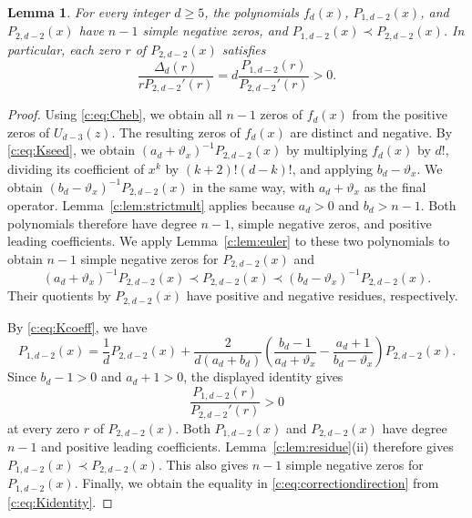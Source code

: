 \documentclass[11pt]{article}
\numberwithin{equation}{section}
\newtheorem{lemma}[theorem]{Lemma}
\theoremstyle{remark}\newtheorem{remark}[theorem]{Remark}
\newcommand{\varthetax}{\vartheta_x}
\begin{document}
\begin{lemma}\label{c:lem:comparisonzeros}
For every integer $d\ge5$, the polynomials $f_d(x)$, $P_{1,d-2}(x)$, and $P_{2,d-2}(x)$
have $n-1$ simple negative zeros, and $P_{1,d-2}(x)\prec P_{2,d-2}(x)$.
In particular, each zero $r$ of $P_{2,d-2}(x)$ satisfies
\begin{equation}\label{c:eq:correctiondirection}
 \frac{\Delta_d(r)}{rP_{2,d-2}'(r)}=d\frac{P_{1,d-2}(r)}{P_{2,d-2}'(r)}>0.
\end{equation}
\end{lemma}
\begin{proof}
Using \eqref{c:eq:Cheb}, we obtain all $n-1$ zeros of $f_d(x)$ from
the positive zeros of $U_{d-3}(z)$. The resulting zeros of $f_d(x)$
are distinct and negative.
By \eqref{c:eq:Kseed}, we obtain
$(a_d+\varthetax)^{-1}P_{2,d-2}(x)$ by multiplying $f_d(x)$ by $d!$,
dividing its coefficient of $x^k$ by $(k+2)!(d-k)!$, and applying
$b_d-\varthetax$. We obtain $(b_d-\varthetax)^{-1}P_{2,d-2}(x)$ in
the same way, with $a_d+\varthetax$ as the final operator.
Lemma~\ref{c:lem:strictmult} applies because $a_d>0$ and $b_d>n-1$.
Both polynomials therefore have degree $n-1$, simple negative zeros,
and positive leading coefficients.
We apply Lemma~\ref{c:lem:euler} to these two polynomials to obtain
$n-1$ simple negative zeros for $P_{2,d-2}(x)$ and
\[
 (a_d+\varthetax)^{-1}P_{2,d-2}(x)\prec P_{2,d-2}(x)
 \prec(b_d-\varthetax)^{-1}P_{2,d-2}(x).
\]
Their quotients by $P_{2,d-2}(x)$ have positive and negative residues,
respectively.

By \eqref{c:eq:Kcoeff}, we have
\[
 P_{1,d-2}(x)=\frac1dP_{2,d-2}(x)+\frac{2}{d(a_d+b_d)}
 \left(\frac{b_d-1}{a_d+\varthetax}
       -\frac{a_d+1}{b_d-\varthetax}\right)P_{2,d-2}(x).
\]
Since $b_d-1>0$ and $a_d+1>0$, the displayed identity gives
\[
 \frac{P_{1,d-2}(r)}{P_{2,d-2}'(r)}>0
\]
at every zero $r$ of $P_{2,d-2}(x)$.
Both $P_{1,d-2}(x)$ and $P_{2,d-2}(x)$ have degree $n-1$ and positive
leading coefficients. Lemma~\ref{c:lem:residue}(ii) therefore gives
$P_{1,d-2}(x)\prec P_{2,d-2}(x)$.
This also gives $n-1$ simple negative zeros for $P_{1,d-2}(x)$.
Finally, we obtain the equality in \eqref{c:eq:correctiondirection}
from \eqref{c:eq:Kidentity}.
\end{proof}
\end{document}
